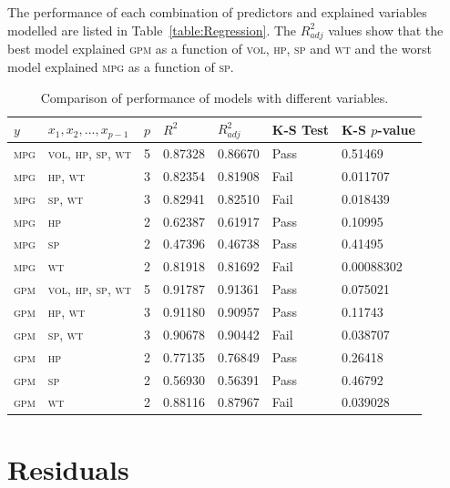 \documentclass[a4paper,10pt,twocolumn]{article}
\newcommand{\MPG}{\textsc{mpg}\xspace}
\newcommand{\GPM}{\textsc{gpm}\xspace}
\newcommand{\VOL}{\textsc{vol}\xspace}
\newcommand{\HP}{\textsc{hp}\xspace}
\newcommand{\SP}{\textsc{sp}\xspace}
\newcommand{\WT}{\textsc{wt}\xspace}
\begin{document}
The performance of each combination of predictors and explained variables 
modelled are listed in Table~\vref{table:Regression}. The $R_{adj}^2$ values 
show that the best model explained \GPM as a function of \VOL, \HP, \SP and 
\WT and the worst model explained \MPG as a function of \SP.

\begin{table}
    \centering
    \caption{Comparison of performance of models with different variables. 
    \vspace{-\parsep}}
    \begin{tabular}{lllllll}
        \toprule
        $y$ & $x_1, x_2, ..., x_{p-1}$ & $p$ & $R^2$ & $R_{adj}^2$ & K-S Test & 
        K-S $p$-value \\
        \midrule
        \MPG & \VOL, \HP, \SP, \WT & 5 & 0.87328 & 0.86670 & Pass & 0.51469 \\
        \MPG & \HP, \WT            & 3 & 0.82354 & 0.81908 & Fail & 0.011707 \\
        \MPG & \SP, \WT            & 3 & 0.82941 & 0.82510 & Fail & 0.018439 \\
        \MPG & \HP                 & 2 & 0.62387 & 0.61917 & Pass & 0.10995 \\
        \MPG & \SP                 & 2 & 0.47396 & 0.46738 & Pass & 0.41495 \\
        \MPG & \WT                 & 2 & 0.81918 & 0.81692 & Fail & 0.00088302\\
        \GPM & \VOL, \HP, \SP, \WT & 5 & 0.91787 & 0.91361 & Pass & 0.075021 \\
        \GPM & \HP, \WT            & 3 & 0.91180 & 0.90957 & Pass & 0.11743 \\
        \GPM & \SP, \WT            & 3 & 0.90678 & 0.90442 & Fail & 0.038707 \\
        \GPM & \HP                 & 2 & 0.77135 & 0.76849 & Pass & 0.26418 \\
        \GPM & \SP                 & 2 & 0.56930 & 0.56391 & Pass & 0.46792 \\
        \GPM & \WT                 & 2 & 0.88116 & 0.87967 & Fail & 0.039028 \\
        \bottomrule
    \end{tabular}
    \label{table:Regression}
\end{table}
    
\section{Residuals}
\end{document}
